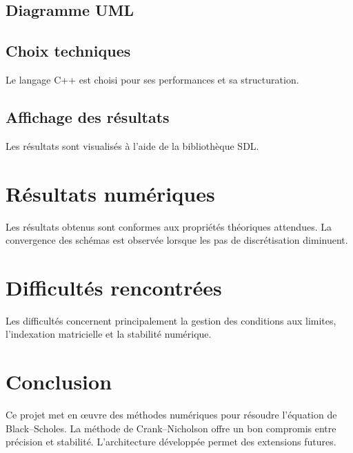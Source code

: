 \documentclass[12pt,a4paper]{article}
\begin{document}
\subsection{Diagramme UML}


\subsection{Choix techniques}

Le langage C++ est choisi pour ses performances et sa structuration.

\subsection{Affichage des résultats}

Les résultats sont visualisés à l’aide de la bibliothèque SDL.

\section{Résultats numériques}

Les résultats obtenus sont conformes aux propriétés théoriques attendues. La
convergence des schémas est observée lorsque les pas de discrétisation diminuent.

\section{Difficultés rencontrées}

Les difficultés concernent principalement la gestion des conditions aux limites,
l’indexation matricielle et la stabilité numérique.

\section{Conclusion}

Ce projet met en œuvre des méthodes numériques pour résoudre l’équation de
Black--Scholes. La méthode de Crank--Nicholson offre un bon compromis entre
précision et stabilité. L’architecture développée permet des extensions futures.
\end{document}
